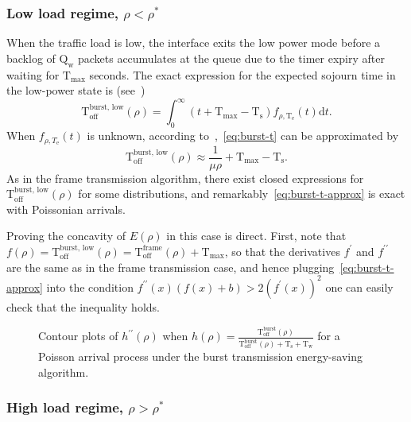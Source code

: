 \documentclass[journal,english,twocolumn,10pt,letterpaper]{IEEEtran}
\newcommand{\added}[1]{{#1}}
\newcommand{\Constantconstant}[2]{\mathrm{#1}_{\mathrm{#2}}}
\newcommand{\Ts}{\Constantconstant T s}
\newcommand{\Tw}{\Constantconstant T w}
\newcommand{\Qw}{\Constantconstant Q w}
\newcommand{\Te}{\Constantconstant T e}
\newcommand{\Tmax}{\Constantconstant T \max}
\newcommand{\Toff}{\mathrm{T}_{\mathrm{off}}}
\begin{document}
\subsubsection{Low load regime, $\rho < \rho^\ast$}
\label{sec:low-load-regime}

When the traffic load is low, the interface exits the low power mode before a
backlog of $\Qw$ packets accumulates at the queue due to the timer expiry
after waiting for $\Tmax$ seconds. The exact expression for the expected
sojourn time in the low-power state is
(see~\cite{herreria12:_gi_g_model_gb_energ_effic_ether})
\begin{equation}
  \label{eq:burst-t}
  \Toff^{\text{burst, low}}(\rho) = \int_0^\infty (t + \Tmax -
  \Ts) f_{\rho,\Te}(t) \textrm{d}t.
\end{equation}
When $f_{\rho,T_{\text{e}}}(t)$ is unknown, \added{according
  to~\cite{herreria12:_gi_g_model_gb_energ_effic_ether}},~\eqref{eq:burst-t}
can be approximated by
\begin{equation}
  \label{eq:burst-t-approx}
   \Toff^{\text{burst, low}}(\rho) \approx \frac{1}{\mu \rho} +
   \Tmax - \Ts.
\end{equation}
As in the frame transmission algorithm, there exist closed expressions for $
\Toff^{\text{burst, low}}(\rho)$ for some distributions, and
remarkably~\eqref{eq:burst-t-approx} is exact with Poissonian arrivals.

Proving the concavity of $E(\rho)$ in this case is direct. First, note that
$f(\rho) = \Toff^{\text{burst, low}}(\rho) = \Toff^{\text{frame}}(\rho) +
\Tmax$, so that the derivatives $f^\prime$ and $f^{\prime\prime}$ are the same
as in the frame transmission case, and hence
plugging~\eqref{eq:burst-t-approx} into the condition $f^{\prime\prime}(x)
(f(x) + b) > 2 (f^\prime(x))^2$ one can easily check that the inequality
holds.

\begin{figure*}
  \centering
  \caption{\label{fig:contour} Contour plots of $h^{\prime\prime}(\rho)$ when
    $h(\rho) = \frac{\Toff^{\text{burst}}(\rho)}{\Toff^{\text{burst}}(\rho) +
      \Ts + \Tw}$ for a Poisson arrival process under the burst transmission
    energy-saving algorithm.}
\end{figure*}

\subsubsection{High load regime, $\rho > \rho^\ast$}
\label{sec:high-load-regime}
\end{document}

